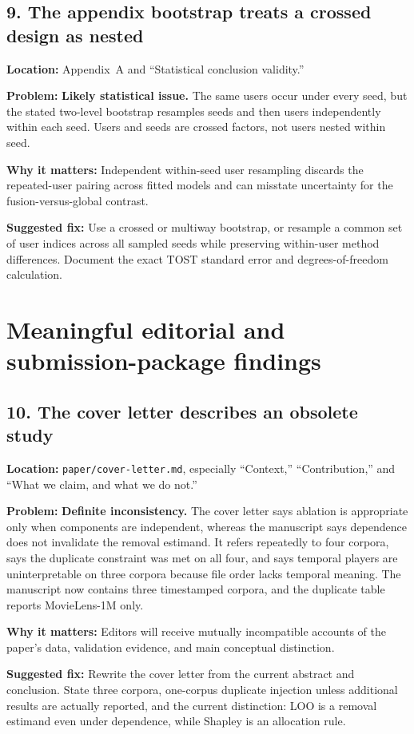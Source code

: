 \documentclass[11pt]{article}
\newcommand{\loc}[1]{\par\noindent\textbf{Location:} #1\par}
\newcommand{\problem}[1]{\noindent\textbf{Problem:} #1\par}
\newcommand{\impact}[1]{\noindent\textbf{Why it matters:} #1\par}
\newcommand{\fix}[1]{\noindent\textbf{Suggested fix:} #1\par}
\begin{document}
\subsection*{9. The appendix bootstrap treats a crossed design as nested}

\loc{Appendix~A and ``Statistical conclusion validity.''}
\problem{\textbf{Likely statistical issue.} The same users occur under every seed, but the stated two-level bootstrap resamples seeds and then users independently within each seed.  Users and seeds are crossed factors, not users nested within seed.}
\impact{Independent within-seed user resampling discards the repeated-user pairing across fitted models and can misstate uncertainty for the fusion-versus-global contrast.}
\fix{Use a crossed or multiway bootstrap, or resample a common set of user indices across all sampled seeds while preserving within-user method differences.  Document the exact TOST standard error and degrees-of-freedom calculation.}

\section*{Meaningful editorial and submission-package findings}

\subsection*{10. The cover letter describes an obsolete study}

\loc{\texttt{paper/cover-letter.md}, especially ``Context,'' ``Contribution,'' and ``What we claim, and what we do not.''}
\problem{\textbf{Definite inconsistency.} The cover letter says ablation is appropriate only when components are independent, whereas the manuscript says dependence does not invalidate the removal estimand.  It refers repeatedly to four corpora, says the duplicate constraint was met on all four, and says temporal players are uninterpretable on three corpora because file order lacks temporal meaning.  The manuscript now contains three timestamped corpora, and the duplicate table reports MovieLens-1M only.}
\impact{Editors will receive mutually incompatible accounts of the paper's data, validation evidence, and main conceptual distinction.}
\fix{Rewrite the cover letter from the current abstract and conclusion.  State three corpora, one-corpus duplicate injection unless additional results are actually reported, and the current distinction: LOO is a removal estimand even under dependence, while Shapley is an allocation rule.}
\end{document}
